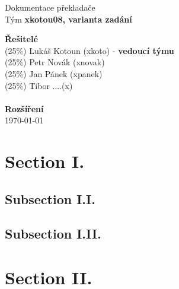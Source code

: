 \documentclass[a4pater]{article}
\begin{document}
\begin{titlepage}
    \begin{center}
        {\Huge Dokumentace překladače} \\[0.4em]
        {\Large Tým \textbf{xkotou08, varianta zadání}}
    \end{center}
    {\Large \textbf{Řešitelé}} \\[0.4em]
        {\Large
        \hspace*{0.5cm} (25\%) Lukáš Kotoun (xkoto) - \textbf{vedoucí týmu}\\
        \hspace*{0.5cm} (25\%) Petr Novák (xnovak) \\
        \hspace*{0.5cm} (25\%) Jan Pánek (xpanek) \\
        \hspace*{0.5cm} (25\%) Tibor ....(x) \\
        }
     \\
    {\Large \textbf{Rozšíření}} \\[0.4em]


    {\Large \today}
\end{titlepage}


\tableofcontents
\newpage


\section{Section I.}
\subsection{Subsection I.I.}
\subsection{Subsection I.II.}
\section{Section II.}
\end{document}
